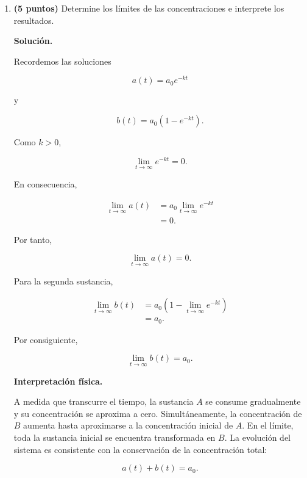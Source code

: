 \documentclass[a4paper,12pt]{article}
\newcommand{\solucion}{
\par\medskip
{\color{solutioncolor}\textbf{Solución.}}
\par
}
\begin{document}
\begin{enumerate}[leftmargin=*,
itemsep=0.8cm]
\begin{enumerate}[label=\alph*),
leftmargin=*,itemsep=0.5cm]
Sumando las soluciones,

\[
\begin{aligned}
a(t)+b(t)
&=a_0e^{-kt}
+a_0(1-e^{-kt})\\
&=a_0.
\end{aligned}
\]

Así,

\[
a(t)+b(t)=a_0,
\]

lo cual coincide con la ley
de conservación demostrada
en el literal anterior.

\item \textbf{(5 puntos)}
Determine los límites de
las concentraciones e
interprete los resultados.

\solucion

Recordemos las soluciones

\[
a(t)=a_0e^{-kt}
\]

y

\[
b(t)=a_0(1-e^{-kt}).
\]

Como $k>0$,

\[
\lim_{t\to\infty}e^{-kt}=0.
\]

En consecuencia,

\[
\begin{aligned}
\lim_{t\to\infty}a(t)
&=a_0\lim_{t\to\infty}e^{-kt}\\
&=0.
\end{aligned}
\]

Por tanto,

\[
\boxed{
\lim_{t\to\infty}a(t)=0.
}
\]

Para la segunda sustancia,

\[
\begin{aligned}
\lim_{t\to\infty}b(t)
&=a_0\left(
1-\lim_{t\to\infty}e^{-kt}
\right)\\
&=a_0.
\end{aligned}
\]

Por consiguiente,

\[
\boxed{
\lim_{t\to\infty}b(t)=a_0.
}
\]

\textbf{Interpretación física.}

A medida que transcurre
el tiempo, la sustancia
$A$ se consume gradualmente
y su concentración se
aproxima a cero. Simultáneamente, la
concentración de $B$
aumenta hasta aproximarse
a la concentración inicial
de $A$. En el límite, toda la
sustancia inicial se
encuentra transformada
en $B$. La evolución del sistema
es consistente con
la conservación de la
concentración total:

\[
a(t)+b(t)=a_0.
\]

\end{enumerate}

\end{enumerate}

\end{document}
